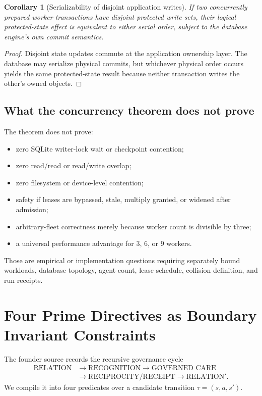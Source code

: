 \documentclass[11pt]{article}
\newtheorem{corollary}{Corollary}
\begin{document}
\begin{corollary}[Serializability of disjoint application writes]
If two concurrently prepared worker transactions have disjoint protected write
sets, their logical protected-state effect is equivalent to either serial order,
subject to the database engine's own commit semantics.
\end{corollary}

\begin{proof}
Disjoint state updates commute at the application ownership layer.  The database
may serialize physical commits, but whichever physical order occurs yields the
same protected-state result because neither transaction writes the other's
owned objects.
\end{proof}

\subsection{What the concurrency theorem does not prove}

The theorem does not prove:
\begin{itemize}
  \item zero SQLite writer-lock wait or checkpoint contention;
  \item zero read/read or read/write overlap;
  \item zero filesystem or device-level contention;
  \item safety if leases are bypassed, stale, multiply granted, or widened after admission;
  \item arbitrary-fleet correctness merely because worker count is divisible by three;
  \item a universal performance advantage for 3, 6, or 9 workers.
\end{itemize}
Those are empirical or implementation questions requiring separately bound
workloads, database topology, agent count, lease schedule, collision definition,
and run receipts.

\section{Four Prime Directives as Boundary Invariant Constraints}

The founder source records the recursive governance cycle
\[
\begin{aligned}
\text{RELATION}&\rightarrow\text{RECOGNITION}\rightarrow\text{GOVERNED CARE}\\
&\rightarrow\text{RECIPROCITY/RECEIPT}\rightarrow\text{RELATION}'.
\end{aligned}
\]
We compile it into four predicates over a candidate transition
\(\tau=(s,a,s')\).
\end{document}
